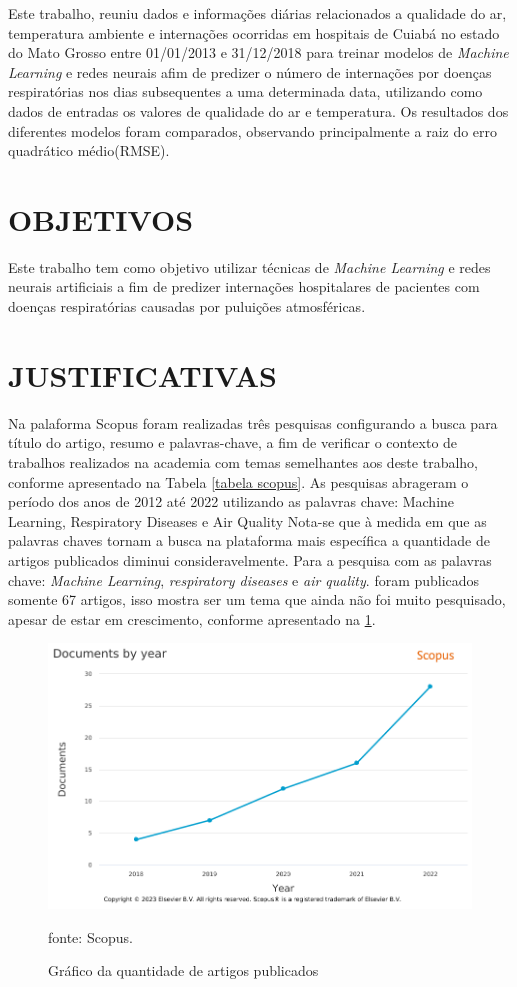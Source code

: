 \documentclass[
  12pt,		%
  a4paper,	%
  openright,%
  oneside,	%
  chapter=TITLE,		%
  section=TITLE,		%
  english,	%
  french,	%
  spanish,	%
  brazil	%
]{abntex2}
\begin{document}
    Este trabalho, reuniu dados e informações diárias relacionados a qualidade do ar, temperatura ambiente e internações ocorridas em hospitais
    de Cuiabá no estado do Mato Grosso entre 01/01/2013 e 31/12/2018 para treinar modelos de \textit{Machine Learning} e redes neurais afim de predizer
    o número de internações por doenças respiratórias nos dias subsequentes a uma determinada data, utilizando como dados de entradas os valores de qualidade do ar
    e temperatura. Os resultados dos diferentes modelos foram comparados, observando principalmente a raiz do erro quadrático médio(RMSE).
    
    \section{OBJETIVOS}
    Este trabalho tem como objetivo utilizar técnicas de \textit{Machine Learning} e redes neurais artificiais a fim de predizer 
    internações hospitalares de pacientes com doenças respiratórias
    causadas por puluições atmosféricas.
    \section{JUSTIFICATIVAS}
    Na palaforma Scopus foram realizadas três pesquisas configurando a busca para título do artigo, resumo e palavras-chave, a fim de verificar o contexto de trabalhos
    realizados na academia com temas semelhantes aos deste trabalho, conforme apresentado na Tabela \ref*{tabela scopus}. As pesquisas abrageram o período dos anos
    de 2012 até 2022 utilizando as palavras chave: Machine Learning, Respiratory Diseases e Air Quality
    Nota-se que à medida em que as palavras chaves tornam a busca na plataforma mais específica a quantidade de artigos publicados diminui consideravelmente.
    Para a pesquisa com as palavras chave: \textit{Machine Learning}, \textit{respiratory diseases} e \textit{air quality}.
    foram publicados somente 67 artigos, isso mostra ser um tema que ainda não foi muito pesquisado, apesar de estar em crescimento,
    conforme apresentado na \ref*{scopus_year}.

    \begin{figure}[ht]
        \centering
        \caption{Gráfico da quantidade de artigos publicados}
        \includegraphics[width=12cm]{../reports/figures/Scopus_Year_ML_RD_AQ.png}
        \label{scopus_year}
        \par
        {\small fonte: Scopus.}
    \end{figure}
\end{document}
